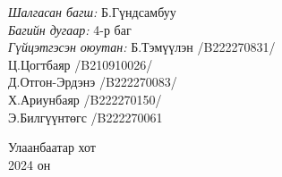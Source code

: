 \begin{titlepage}
\begin{center}
\begin{minipage}[t] {0.9\textwidth}
\begin{flushleft}
\emph{Шалгасан багш:} {\hspace{4.3cm} Б.Гүндсамбуу } \\%
\emph{Багийн дугаар: }  {\hspace{4.3cm} 4-р  баг  }\\
\emph{Гүйцэтгэсэн оюутан: }  {\hspace{3cm} Б.Тэмүүлэн /B222270831/  }\\
{\hspace{7.5cm} Ц.Цогтбаяр /B210910026/  }\\
{\hspace{7.5cm} Д.Отгон-Эрдэнэ /B222270083/  }\\
{\hspace{7.5cm} Х.Ариунбаяр /B222270150/  }\\
{\hspace{7.5cm} Э.Билгүүнтөгс /B222270061}\\

\end{flushleft}
\end{minipage}

\vfill

\large {Улаанбаатар хот} \\
{\large 2024 он}\\ %

\end{center}
\end{titlepage}